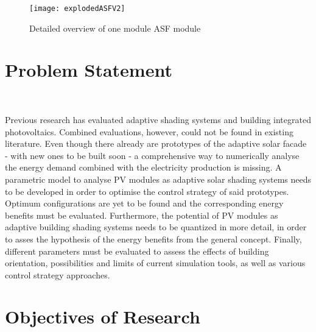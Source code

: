 	\begin{figure}[ht] %
		\begin{center}
		\texttt{[image: explodedASFV2]}
		\caption{Detailed overview of one module ASF module}
		\label{fig:exploded}
		\end{center} 
	\end{figure}


\section{Problem Statement}\

	Previous research has evaluated adaptive shading systems and building integrated photovoltaics. Combined evaluations, however, could not be found in existing literature. Even though there already are prototypes of the adaptive solar facade - with new ones to be built soon - a comprehensive way to numerically analyse the energy demand combined with the electricity production is missing. A parametric model to analyse PV modules as adaptive solar shading systems needs to be developed in order to optimise the control strategy of said prototypes. Optimum configurations are yet to be found and the corresponding energy benefits must be evaluated. Furthermore, the potential of PV modules as adaptive building shading systems needs to be quantized in more detail, in order to asses the hypothesis of the energy benefits from the general concept. Finally, different parameters must be evaluated to assess the effects of building orientation, possibilities and limits of current simulation tools, as well as various control strategy approaches.




\section{Objectives of Research}\

